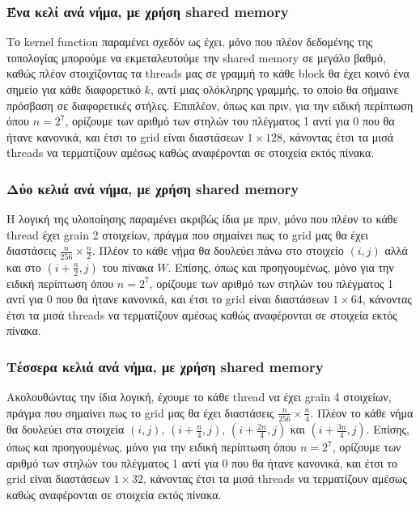 \documentclass[11pt,a4paper,titlepage]{article}
\begin{document}

\subsubsection{Ένα κελί ανά νήμα, με χρήση shared memory}
Το kernel function παραμένει σχεδόν ως έχει, μόνο που πλέον δεδομένης της τοπολογίας μπορούμε να εκμεταλευτούμε την shared memory σε μεγάλο βαθμό, καθώς πλέον στοιχίζοντας τα threads μας σε γραμμή το κάθε block θα έχει κοινό ένα σημείο για κάθε διαφορετικό $k$, αντί μιας ολόκληρης γραμμής, το οποίο θα σήμαινε πρόσβαση σε διαφορετικές στήλες. Επιπλέον, όπως και πριν, για την ειδική περίπτωση όπου $n=2^7$, ορίζουμε των αριθμό των στηλών του πλέγματος 1 αντί για 0 που θα ήτανε κανονικά, και έτσι το grid είναι διαστάσεων $1\times 128$, κάνοντας έτσι τα μισά threads να τερματίζουν αμέσως καθώς αναφέρονται σε στοιχεία εκτός πίνακα.

\subsubsection{Δύο κελιά ανά νήμα, με χρήση shared memory}
Η λογική της υλοποίησης παραμένει ακριβώς ίδια με πριν, μόνο που πλέον το κάθε thread έχει grain 2 στοιχείων, πράγμα που σημαίνει πως το grid μας θα έχει διαστάσεις $\tfrac{n}{256}\times\tfrac{n}{2}$. Πλέον το κάθε νήμα θα δουλεύει πάνω στο στοιχείο $(i, j)$ αλλά και στο $(i + \tfrac{n}{2}, j)$ του πίνακα $W$. Επίσης, όπως και προηγουμένως, μόνο για την ειδική περίπτωση όπου $n = 2^7$, ορίζουμε των αριθμό των στηλών του πλέγματος 1 αντί για 0 που θα ήτανε κανονικά, και έτσι το grid είναι διαστάσεων $1\times 64$, κάνοντας έτσι τα μισά threads να τερματίζουν αμέσως καθώς αναφέρονται σε στοιχεία εκτός πίνακα.

\subsubsection{Τέσσερα κελιά ανά νήμα, με χρήση shared memory}
Ακολουθώντας την ίδια λογική, έχουμε το κάθε thread να έχει grain 4 στοιχείων, πράγμα που σημαίνει πως το grid μας θα έχει διαστάσεις $\tfrac{n}{256}\times\tfrac{n}{4}$. Πλέον το κάθε νήμα θα δουλεύει στα στοιχεία $\left(i, j\right)$, $\left(i + \tfrac{n}{4}, j\right)$, $\left(i + \tfrac{2n}{4}, j\right)$ και $\left(i + \tfrac{3n}{4}, j\right)$. Επίσης, όπως και προηγουμένως, μόνο για την ειδική περίπτωση όπου $n = 2^7$, ορίζουμε των αριθμό των στηλών του πλέγματος 1 αντί για 0 που θα ήτανε κανονικά, και έτσι το grid είναι διαστάσεων $1\times 32$, κάνοντας έτσι τα μισά threads να τερματίζουν αμέσως καθώς αναφέρονται σε στοιχεία εκτός πίνακα.
\end{document}
